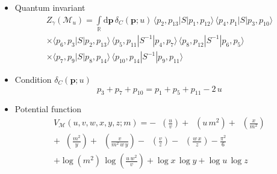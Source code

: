 \documentclass[12pt,reqno]{amsart}
\numberwithin{equation}{section}
\DeclareMathOperator{\Li}{Li_2}
\begin{document}
\begin{itemize}
\item Quantum invariant
  \begin{multline*}
    Z_\gamma \left( \mathcal{M}_u \right)
    = \int\limits_\mathbb{R} 
 \mathrm{d} \boldsymbol{p} \,
  \delta_C(\boldsymbol{p}; u) \,
    \langle p_2 , p_{13} | S | p_1 , p_{12} \rangle \,
    \langle p_4 , p_{1} | S | p_3 , p_{10} \rangle
    \\
    \times 
    \langle p_6 , p_{3} | S | p_2 , p_{13} \rangle \,
    \langle p_5 , p_{11} | S^{-1} | p_4 , p_{7} \rangle \,
    \langle p_8 , p_{12} | S^{-1} | p_6 , p_{5} \rangle
    \\
    \times 
    \langle p_7 , p_{9} | S | p_8 , p_{14} \rangle \,
    \langle p_{10} , p_{14} | S^{-1} | p_9 , p_{11} \rangle 
  \end{multline*}

\item
Condition $\delta_C(\boldsymbol{p};u)$
\begin{equation*}
  p_3 + p_7 + p_{10} = p_1 + p_5 + p_{11} -  2 \, u
\end{equation*}

\item Potential function
  \begin{multline*}
    V_{\mathcal{M}}(u, v,w,x,y,z; m)
    =
    - \Li\left(\frac{u}{v}\right)
    + \Li\left(u \, m^2\right)
    + \Li\left(\frac{x}{m^2}\right)
    \\
    + \Li\left(\frac{m^2}{y}\right)
    + \Li\left(\frac{v}{m^2 \, w \, y}\right)
    - \Li\left(\frac{v}{z}\right)
    - \Li\left(\frac{w \, x}{z}\right)
    -\frac{\pi^2}{6}
    \\
    + \log \left(m^2\right) \, \log \left(\frac{u \, w^2}{v}\right)
    + \log x \, \log y + \log u \, \log z
  \end{multline*}


\end{itemize}
\end{document}
